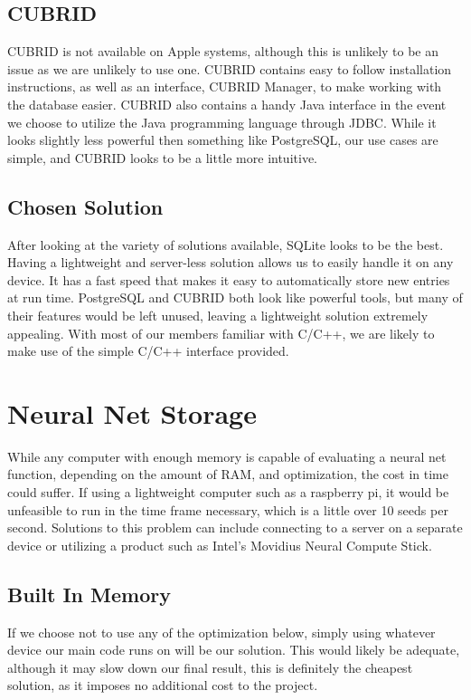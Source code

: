 \documentclass[onecolumn, draftclsnofoot,10pt, compsoc]{IEEEtran}
\begin{document}
\subsection{CUBRID}
CUBRID is not available on Apple systems, although this is unlikely to be an issue as we are unlikely to use one. CUBRID contains easy to follow installation instructions, as well as an interface, CUBRID Manager, to make working with the database easier. \cite{cubrid} CUBRID also contains a handy Java interface in the event we choose to utilize the Java programming language through JDBC. \cite{cubrid} While it looks slightly less powerful then something like PostgreSQL, our use cases are simple, and CUBRID looks to be a little more intuitive.
\subsection{Chosen Solution}
After looking at the variety of solutions available, SQLite looks to be the best. Having a lightweight and server-less solution allows us to easily handle it on any device. It has a fast speed that makes it easy to automatically store new entries at run time. PostgreSQL and CUBRID both look like powerful tools, but many of their features would be left unused, leaving a lightweight solution extremely appealing. With most of our members familiar with C/C++, we are likely to make use of the simple C/C++ interface provided.

\section{Neural Net Storage}

While any computer with enough memory is capable of evaluating a neural net function, depending on the amount of RAM, and optimization, the cost in time could suffer. If using a lightweight computer such as a raspberry pi, it would be unfeasible to run in the time frame necessary, which is a little over 10 seeds per second. Solutions to this problem can include connecting to a server on a separate device or utilizing a product such as Intel's Movidius Neural Compute Stick. 
\subsection{Built In Memory}
If we choose not to use any of the optimization below, simply using whatever device our main code runs on will be our solution. This would likely be adequate, although it may slow down our final result, this is definitely the cheapest solution, as it imposes no additional cost to the project.
\end{document}
